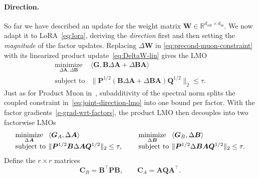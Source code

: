 \documentclass[11pt]{article}
\newcommand{\mat}[1]{\bm{#1}}
\newcommand{\R}{\mathbb{R}}
\newcommand{\ip}[1]{\langle #1 \rangle}
\newcommand{\norm}[1]{\| #1\|}
\begin{document}
\paragraph{Direction.}
So far we have described an update for the weight matrix $\mat{W} \in \R^{d_{\mathrm{out}} \times d_{\mathrm{in}}}$. We now adapt it to LoRA~\eqref{eq:lora}, deriving the \emph{direction} first and then setting the \emph{magnitude} of the factor updates. Replacing $\Delta\mat{W}$ in \eqref{eq:precond-muon-constraint} with its linearized product update~\eqref{eq:DeltaW-lin} gives the LMO
\begin{equation}
    \begin{array}{ll}
    \underset{\Delta\mat{A},\Delta\mat{B}}{\mathrm{minimize}} &
    \ip{\mat{G}, \mat{B}\Delta\mat{A}+\Delta\mat{B} \mat{A}} \\[2pt]
    \mbox{subject to} &
    \norm{\mat{P}^{1/2}(\mat{B}\Delta\mat{A}+\Delta\mat{B} \mat{A})\mat{Q}^{1/2}}_2
    \le \tau.
    \end{array}
    \label{eq:joint-direction-lmo}
  \end{equation}
Just as for Product Muon in~, subadditivity of the spectral norm splits the coupled constraint in~\eqref{eq:joint-direction-lmo} into one bound per factor. With the factor gradients~\eqref{e-grad-wrt-factors}, the product LMO then decouples into two factorwise LMOs
\begin{equation}
\setlength{\arraycolsep}{2pt}
\begin{array}{@{}c@{\qquad}c@{}}
\begin{array}{ll}
\underset{\Delta\mat{A}}{\mathrm{minimize}} &
\ip{\mat{G}_A,\Delta\mat{A}} \\[2pt]
\mbox{subject to} &
\norm{\mat{P}^{1/2}\mat{B}\Delta\mat{A} \mat{Q}^{1/2}}_2 \le \tau ,
\end{array}
&
\begin{array}{ll}
\underset{\Delta\mat{B}}{\mathrm{minimize}} &
\ip{\mat{G}_B,\Delta\mat{B}} \\[2pt]
\mbox{subject to} &
\norm{\mat{P}^{1/2}\Delta\mat{B} \mat{A} \mat{Q}^{1/2}}_2 \le \tau .
\end{array}
\end{array}
\label{eq:decoupled-direction-lmo}
\end{equation}
Define the $r\times r$ matrices
\begin{equation}
\mat{C}_B = \mat{B}^\top \mat{P} \mat{B},
\qquad
\mat{C}_A = \mat{A} \mat{Q} \mat{A}^\top .
\label{eq:ours-closure}
\end{equation}
\end{document}
